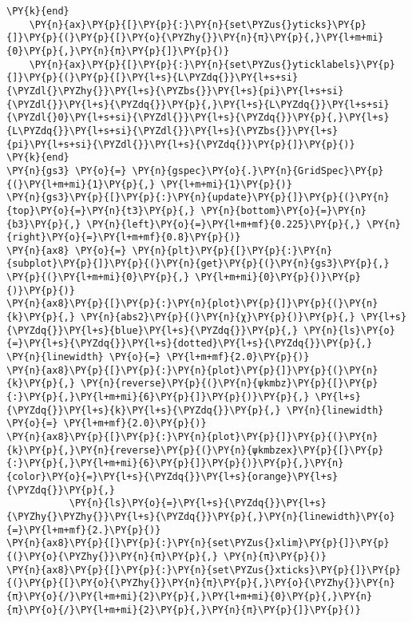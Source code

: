 \begin{Verbatim}[commandchars=\\\{\}]
    \PY{k}{end}
    \PY{n}{ax}\PY{p}{[}\PY{p}{:}\PY{n}{set\PYZus{}yticks}\PY{p}{]}\PY{p}{(}\PY{p}{[}\PY{o}{\PYZhy{}}\PY{n}{π}\PY{p}{,}\PY{l+m+mi}{0}\PY{p}{,}\PY{n}{π}\PY{p}{]}\PY{p}{)}
    \PY{n}{ax}\PY{p}{[}\PY{p}{:}\PY{n}{set\PYZus{}yticklabels}\PY{p}{]}\PY{p}{(}\PY{p}{[}\PY{l+s}{L\PYZdq{}}\PY{l+s+si}{\PYZdl{}\PYZhy{}}\PY{l+s}{\PYZbs{}}\PY{l+s}{pi}\PY{l+s+si}{\PYZdl{}}\PY{l+s}{\PYZdq{}}\PY{p}{,}\PY{l+s}{L\PYZdq{}}\PY{l+s+si}{\PYZdl{}0}\PY{l+s+si}{\PYZdl{}}\PY{l+s}{\PYZdq{}}\PY{p}{,}\PY{l+s}{L\PYZdq{}}\PY{l+s+si}{\PYZdl{}}\PY{l+s}{\PYZbs{}}\PY{l+s}{pi}\PY{l+s+si}{\PYZdl{}}\PY{l+s}{\PYZdq{}}\PY{p}{]}\PY{p}{)}
\PY{k}{end}
\PY{n}{gs3} \PY{o}{=} \PY{n}{gspec}\PY{o}{.}\PY{n}{GridSpec}\PY{p}{(}\PY{l+m+mi}{1}\PY{p}{,} \PY{l+m+mi}{1}\PY{p}{)}
\PY{n}{gs3}\PY{p}{[}\PY{p}{:}\PY{n}{update}\PY{p}{]}\PY{p}{(}\PY{n}{top}\PY{o}{=}\PY{n}{t3}\PY{p}{,} \PY{n}{bottom}\PY{o}{=}\PY{n}{b3}\PY{p}{,} \PY{n}{left}\PY{o}{=}\PY{l+m+mf}{0.225}\PY{p}{,} \PY{n}{right}\PY{o}{=}\PY{l+m+mf}{0.8}\PY{p}{)}
\PY{n}{ax8} \PY{o}{=} \PY{n}{plt}\PY{p}{[}\PY{p}{:}\PY{n}{subplot}\PY{p}{]}\PY{p}{(}\PY{n}{get}\PY{p}{(}\PY{n}{gs3}\PY{p}{,} \PY{p}{(}\PY{l+m+mi}{0}\PY{p}{,} \PY{l+m+mi}{0}\PY{p}{)}\PY{p}{)}\PY{p}{)}
\PY{n}{ax8}\PY{p}{[}\PY{p}{:}\PY{n}{plot}\PY{p}{]}\PY{p}{(}\PY{n}{k}\PY{p}{,} \PY{n}{abs2}\PY{p}{(}\PY{n}{χ}\PY{p}{)}\PY{p}{,} \PY{l+s}{\PYZdq{}}\PY{l+s}{blue}\PY{l+s}{\PYZdq{}}\PY{p}{,} \PY{n}{ls}\PY{o}{=}\PY{l+s}{\PYZdq{}}\PY{l+s}{dotted}\PY{l+s}{\PYZdq{}}\PY{p}{,} \PY{n}{linewidth} \PY{o}{=} \PY{l+m+mf}{2.0}\PY{p}{)}
\PY{n}{ax8}\PY{p}{[}\PY{p}{:}\PY{n}{plot}\PY{p}{]}\PY{p}{(}\PY{n}{k}\PY{p}{,} \PY{n}{reverse}\PY{p}{(}\PY{n}{ψkmbz}\PY{p}{[}\PY{p}{:}\PY{p}{,}\PY{l+m+mi}{6}\PY{p}{]}\PY{p}{)}\PY{p}{,} \PY{l+s}{\PYZdq{}}\PY{l+s}{k}\PY{l+s}{\PYZdq{}}\PY{p}{,} \PY{n}{linewidth} \PY{o}{=} \PY{l+m+mf}{2.0}\PY{p}{)}
\PY{n}{ax8}\PY{p}{[}\PY{p}{:}\PY{n}{plot}\PY{p}{]}\PY{p}{(}\PY{n}{k}\PY{p}{,}\PY{n}{reverse}\PY{p}{(}\PY{n}{ψkmbzex}\PY{p}{[}\PY{p}{:}\PY{p}{,}\PY{l+m+mi}{6}\PY{p}{]}\PY{p}{)}\PY{p}{,}\PY{n}{color}\PY{o}{=}\PY{l+s}{\PYZdq{}}\PY{l+s}{orange}\PY{l+s}{\PYZdq{}}\PY{p}{,}
           \PY{n}{ls}\PY{o}{=}\PY{l+s}{\PYZdq{}}\PY{l+s}{\PYZhy{}\PYZhy{}}\PY{l+s}{\PYZdq{}}\PY{p}{,}\PY{n}{linewidth}\PY{o}{=}\PY{l+m+mf}{2.}\PY{p}{)}
\PY{n}{ax8}\PY{p}{[}\PY{p}{:}\PY{n}{set\PYZus{}xlim}\PY{p}{]}\PY{p}{(}\PY{o}{\PYZhy{}}\PY{n}{π}\PY{p}{,} \PY{n}{π}\PY{p}{)}
\PY{n}{ax8}\PY{p}{[}\PY{p}{:}\PY{n}{set\PYZus{}xticks}\PY{p}{]}\PY{p}{(}\PY{p}{[}\PY{o}{\PYZhy{}}\PY{n}{π}\PY{p}{,}\PY{o}{\PYZhy{}}\PY{n}{π}\PY{o}{/}\PY{l+m+mi}{2}\PY{p}{,}\PY{l+m+mi}{0}\PY{p}{,}\PY{n}{π}\PY{o}{/}\PY{l+m+mi}{2}\PY{p}{,}\PY{n}{π}\PY{p}{]}\PY{p}{)}

\end{Verbatim}
